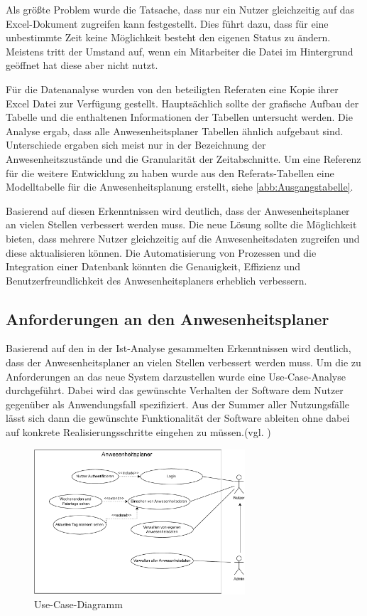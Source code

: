 Als größte Problem wurde die Tatsache, dass nur ein Nutzer gleichzeitig auf das Excel-Dokument zugreifen kann festgestellt. Dies führt dazu, dass für eine unbestimmte Zeit keine Möglichkeit besteht den eigenen Status zu ändern. Meistens tritt der Umstand auf, wenn ein Mitarbeiter die Datei im Hintergrund geöffnet hat diese aber nicht nutzt.

Für die Datenanalyse wurden von den beteiligten Referaten eine Kopie ihrer Excel Datei zur Verfügung gestellt. Hauptsächlich sollte der grafische Aufbau der Tabelle und die enthaltenen Informationen der Tabellen untersucht werden. Die Analyse ergab, dass alle Anwesenheitsplaner Tabellen ähnlich aufgebaut sind. Unterschiede ergaben sich meist nur in der Bezeichnung der Anwesenheitszustände und die Granularität der Zeitabschnitte. Um eine Referenz für die weitere Entwicklung zu haben wurde aus den Referats-Tabellen eine Modelltabelle für die Anwesenheitsplanung erstellt, siehe \ref{abb:Ausgangstabelle}.

Basierend auf diesen Erkenntnissen wird deutlich, dass der Anwesenheitsplaner an vielen Stellen verbessert werden muss. Die neue Lösung sollte die Möglichkeit bieten, dass mehrere Nutzer gleichzeitig auf die Anwesenheitsdaten zugreifen und diese aktualisieren können. Die Automatisierung von Prozessen und die Integration einer Datenbank könnten die Genauigkeit, Effizienz und Benutzerfreundlichkeit des Anwesenheitsplaners erheblich verbessern.

\subsection{Anforderungen an den Anwesenheitsplaner}
\label{sec:Soll-Zustand}
Basierend auf den in der Ist-Analyse gesammelten Erkenntnissen wird deutlich, dass der Anwesenheitsplaner an vielen Stellen verbessert werden muss. Um die zu Anforderungen an das neue System darzustellen wurde eine Use-Case-Analyse durchgeführt. Dabei wird das gewünschte Verhalten der Software dem Nutzer gegenüber als Anwendungsfall spezifiziert. Aus der Summer aller Nutzungsfälle lässt sich dann die gewünschte Funktionalität der Software ableiten ohne dabei auf konkrete Realisierungsschritte eingehen zu müssen.(vgl. \cite[S. 164]{neumann-2002})

\begin{figure}[htb]
    \centering
    \includegraphics[width=0.7\textwidth,angle=0]{abb/use-case-diagramm.pdf}
    \caption[Beschreibung]{Use-Case-Diagramm}
    \label{fig:Use-Case-Diagramm}
\end{figure}

